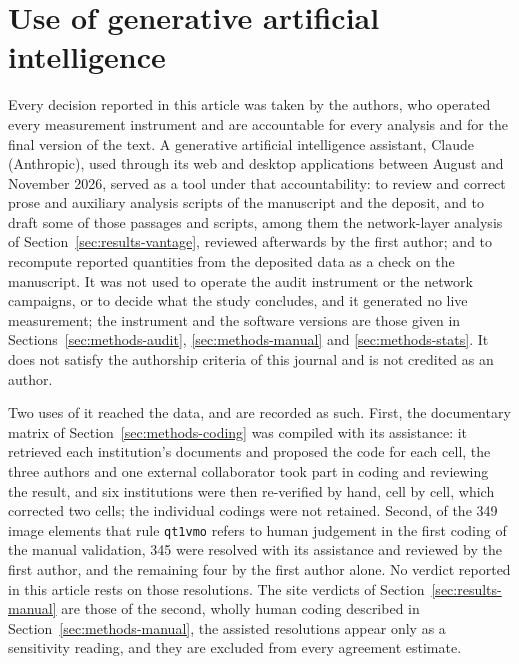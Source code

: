 \documentclass[]{interact}
\newif\ifanon
\begin{document}
\section*{Use of generative artificial intelligence}
Every decision reported in this article was taken by the authors, who operated every measurement instrument and are accountable for every analysis and for the final version of the text. A generative artificial intelligence assistant, Claude (Anthropic), used through its web and desktop applications between August and November 2026, served as a tool under that accountability: to review and correct prose and auxiliary analysis scripts of the manuscript and the deposit, and to draft some of those passages and scripts, among them the network-layer analysis of Section~\ref{sec:results-vantage}, reviewed afterwards by the first author; and to recompute reported quantities from the deposited data as a check on the manuscript. It was not used to operate the audit instrument or the network campaigns, or to decide what the study concludes, and it generated no live measurement; the instrument and the software versions are those given in Sections~\ref{sec:methods-audit}, \ref{sec:methods-manual} and \ref{sec:methods-stats}. It does not satisfy the authorship criteria of this journal and is not credited as an author.

Two uses of it reached the data, and are recorded as such. First, the documentary matrix of Section~\ref{sec:methods-coding} was compiled with its assistance: it retrieved each institution's documents and proposed the code for each cell, the three authors and one external collaborator took part in coding and reviewing the result, and six institutions were then re-verified by hand, cell by cell, which corrected two cells; the individual codings were not retained. Second, of the 349 image elements that rule \texttt{qt1vmo} refers to human judgement in the first coding of the manual validation, 345 were resolved with its assistance and reviewed by the first author, and the remaining four by the first author alone. No verdict reported in this article rests on those resolutions. The site verdicts of Section~\ref{sec:results-manual} are those of the second, wholly human coding described in Section~\ref{sec:methods-manual}, the assisted resolutions appear only as a sensitivity reading, and they are excluded from every agreement estimate.

\ifanon\else
\end{document}
